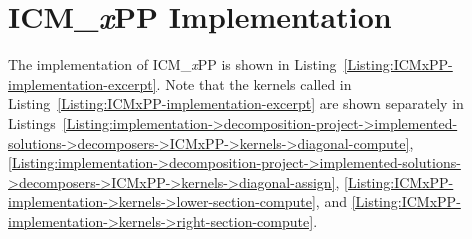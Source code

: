 \chapter{ICM\_\textit{x}PP Implementation}\label{Appendix:ICMxPP-implementation}
The implementation of ICM\_\textit{x}PP is shown in Listing~\ref{Listing:ICMxPP-implementation-excerpt}.
Note that the kernels called in Listing~\ref{Listing:ICMxPP-implementation-excerpt} are shown separately in Listings~\ref{Listing:implementation->decomposition-project->implemented-solutions->decomposers->ICMxPP->kernels->diagonal-compute}, \ref{Listing:implementation->decomposition-project->implemented-solutions->decomposers->ICMxPP->kernels->diagonal-assign}, \ref{Listing:ICMxPP-implementation->kernels->lower-section-compute}, and \ref{Listing:ICMxPP-implementation->kernels->right-section-compute}.

